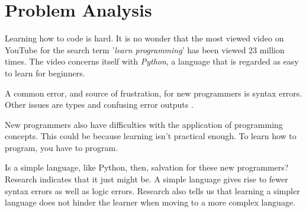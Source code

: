 \chapter{Problem Analysis} \label{chap:analysis}
Learning how to code is hard. It is no wonder that the most viewed video on YouTube for the search term '\textit{learn programming}' has been viewed 23 million times\cite{LearnProgrammingYouTube}. The video concerns itself with \textit{Python}, a language that is regarded as easy to learn for beginners\cite{PythonBeginners}.

A common error, and source of frustration, for new programmers is syntax errors. Other issues are types and confusing error outputs \cite{bosseWhyProgrammingDifficult2017}.

New programmers also have difficulties with the application of programming concepts. This could be because learning isn't practical enough\cite{lahtinenStudyDifficultiesNovice2005}. To learn how to program, you have to program.

Is a simple language, like Python, then, salvation for these new programmers? Research indicates that it just might be. A simple language gives rise to fewer syntax errors as well as logic errors. Research also tells us that learning a simpler language does not hinder the learner when moving to a more complex language\cite{mannilaWhatSimpleLanguage2006}.

